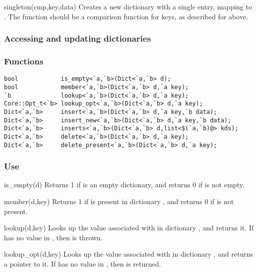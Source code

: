 \begin{defun}{singleton}{(cmp,key,data)}
Creates a new dictionary with a single entry, mapping  to
.  The function  should be a comparison function for
keys, as described for  above.
\end{defun}

\subsubsection*{Accessing and updating dictionaries}

\subsubsection*{Functions}
\begin{verbatim}
bool            is_empty<`a,`b>(Dict<`a,`b> d);
bool            member<`a,`b>(Dict<`a,`b> d,`a key);
`b              lookup<`a,`b>(Dict<`a,`b> d,`a key);
Core::Opt_t<`b> lookup_opt<`a,`b>(Dict<`a,`b> d,`a key);
Dict<`a,`b>     insert<`a,`b>(Dict<`a,`b> d,`a key,`b data);
Dict<`a,`b>     insert_new<`a,`b>(Dict<`a,`b> d,`a key,`b data);
Dict<`a,`b>     inserts<`a,`b>(Dict<`a,`b> d,list<$(`a,`b)@> kds);
Dict<`a,`b>     delete<`a,`b>(Dict<`a,`b> d,`a key);
Dict<`a,`b>     delete_present<`a,`b>(Dict<`a,`b> d,`a key);
\end{verbatim}

\subsubsection*{Use}

\begin{defun}{is_empty}{(d)}
Returns 1 if  is an empty dictionary, and returns 0 if  is
not empty.
\end{defun}

\begin{defun}{member}{(d,key)}
Returns 1 if  is present in dictionary , and returns 0
if  is not present.
\end{defun}

\begin{defun}{lookup}{(d,key)}
Looks up the value associated with  in dictionary , and
returns it.  If  has no value in , then  is
thrown.
\end{defun}

\begin{defun}{lookup_opt}{(d,key)}
Looks up the value associated with  in dictionary , and
returns a pointer to it.  If  has no value in , then
 is returned.
\end{defun}

